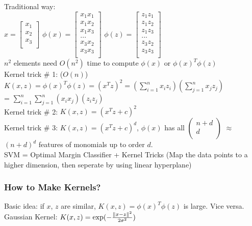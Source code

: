 \documentclass{article}
\begin{document}
\noindent
Traditional way:\\
$x = \begin{bmatrix}
  x_1\\
  x_2\\
  x_3\\
  \end{bmatrix}$
$\phi(x) = \begin{bmatrix}
  x_1x_1\\
  x_1x_2\\
  x_1x_3\\
  ...\\
  x_3x_2\\
  x_3x_3\\
  \end{bmatrix}$
$\phi(z) = \begin{bmatrix}
  z_1z_1\\
  z_1z_2\\
  z_1z_3\\
  ...\\
  z_3z_2\\
  z_3z_3\\
  \end{bmatrix}$\\

\noindent
$n^2$ elements need $O(n^2)$ time to compute $\phi(x)$ or ${\phi(x)}^T\phi(z)$\\

\noindent
Kernel trick \# 1: ($O(n)$)\\
$K(x,z) = {\phi(x)}^T\phi(z) = (x^Tz)^2 = (\sum\limits_{i=1}^nx_iz_i)(\sum\limits_{j=1}^nx_jz_j)$\\
= $\sum\limits_{i=1}^n\sum\limits_{j=1}^n(x_ix_j)(z_iz_j)$\\

\noindent
Kernel trick \# 2: $K(x,z) = (x^Tz + c)^2$\\
Kernel trick \# 3: $K(x,z) = (x^Tz + c)^d$, $\phi(x)$ has all 
$\begin{pmatrix}
  n+d\\
  d\\
  \end{pmatrix}$ $\approx$ $(n+d)^d$ features of monomials up to order $d$.\\

\noindent
SVM = Optimal Margin Classifier + Kernel Tricks (Map the data points to a higher dimension, then seperate by using linear hyperplane)

\subsubsection{How to Make Kernels?}
Basic idea: if $x$, $z$ are similar, $K(x,z)={\phi(x)}^T\phi(z)$ is large. Vice versa.\\
Gaussian Kernel: $K(x,z) = {\rm exp} (-\frac{{\Vert x-z \Vert}^2}{{2\sigma}^2})$\\
\end{document}
